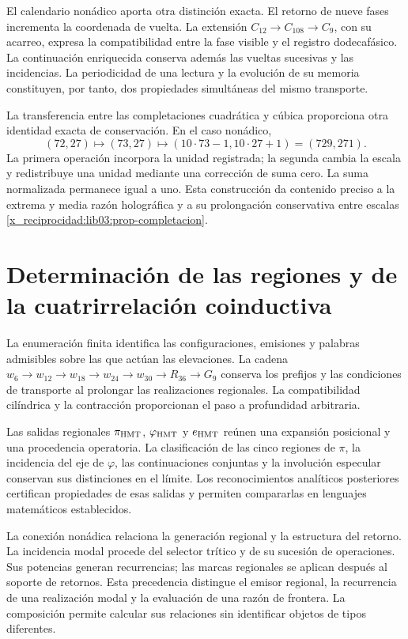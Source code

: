 El calendario nonádico aporta otra distinción exacta. El retorno
de nueve fases incrementa la coordenada de vuelta. La extensión
\(C_{12}\to C_{108}\to C_9\), con su acarreo, expresa la
compatibilidad entre la fase visible y el registro dodecafásico.
La continuación enriquecida conserva además las vueltas sucesivas
y las incidencias. La periodicidad de una lectura y la evolución
de su memoria constituyen, por tanto, dos propiedades simultáneas
del mismo transporte.

La transferencia entre las completaciones cuadrática y cúbica
proporciona otra identidad exacta de conservación. En el caso
nonádico,
\[
 (72,27)\longmapsto(73,27)
 \longmapsto(10\cdot73-1,10\cdot27+1)=(729,271).
\]
La primera operación incorpora la unidad registrada; la segunda
cambia la escala y redistribuye una unidad mediante una corrección
de suma cero. La suma normalizada permanece igual a uno. Esta
construcción da contenido preciso a la extrema y media razón
holográfica y a su prolongación conservativa entre escalas
\ref{x_reciprocidad:lib03:prop-completacion}.

\section{Determinación de las regiones y de la cuatrirrelación coinductiva}

La enumeración finita identifica las configuraciones, emisiones y
palabras admisibles sobre las que actúan las elevaciones. La cadena
\(w_6\to w_{12}\to w_{18}\to w_{24}\to w_{30}\to R_{36}\to G_9\)
conserva los prefijos y las condiciones de transporte al prolongar
las realizaciones regionales. La compatibilidad cilíndrica y la
contracción proporcionan el paso a profundidad arbitraria.

Las salidas regionales \(\pi_{\rm HMT}\),
\(\varphi_{\rm HMT}\) y \(e_{\rm HMT}\) reúnen una expansión
posicional y una procedencia operatoria. La clasificación de las
cinco regiones de \(\pi\), la incidencia del eje de
\(\varphi\), las continuaciones conjuntas y la involución especular
conservan sus distinciones en el límite. Los reconocimientos
analíticos posteriores certifican propiedades de esas salidas y
permiten compararlas en lenguajes matemáticos establecidos.

La conexión nonádica relaciona la generación regional y la
estructura del retorno. La incidencia modal procede del selector
trítico y de su sucesión de operaciones. Sus potencias generan
recurrencias; las marcas regionales se aplican después al soporte
de retornos. Esta precedencia distingue el emisor regional,
la recurrencia de una realización modal y la evaluación de una
razón de frontera. La composición permite calcular sus relaciones
sin identificar objetos de tipos diferentes.

